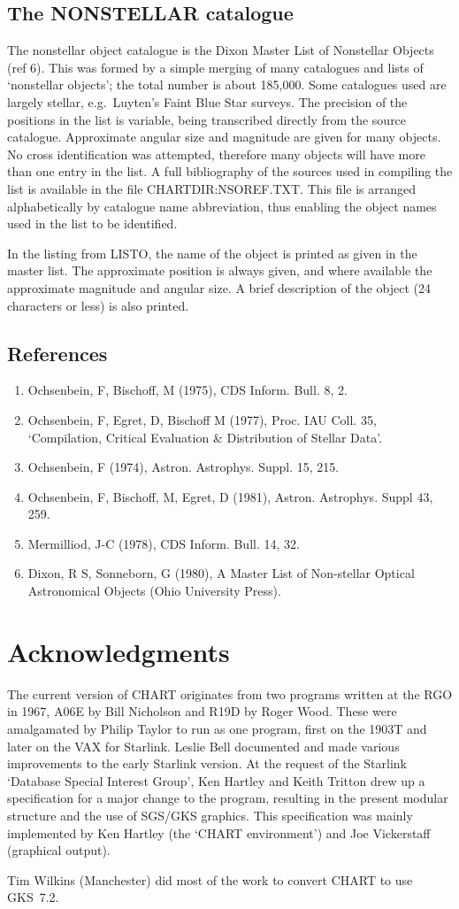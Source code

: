 \documentclass{article}
\begin{document}
\subsection{The NONSTELLAR catalogue}
The nonstellar object catalogue is the Dixon Master List of Nonstellar Objects
(ref 6).
This was formed by a simple merging of many catalogues and lists of
`nonstellar objects'; the total number is about 185,000.
Some catalogues used are largely stellar, e.g.\ Luyten's Faint Blue Star
surveys. The precision of the positions in the list is variable, being
transcribed directly from the source catalogue.
Approximate angular size and magnitude are given for many objects.
No cross identification was attempted, therefore many objects will have more
than one entry in the list.
A full bibliography of the sources used in compiling the list is available in
the file CHARTDIR:NSOREF.TXT.
This file is arranged alphabetically by catalogue name abbreviation, thus
enabling the object names used in the list to be identified.

In the listing from LISTO, the name of the object is printed as given in the
master list.
The approximate position is always given, and where available the approximate
magnitude and angular size.
A brief description of the object (24 characters or less) is also printed.
\subsection{References}
\begin{enumerate}
\item Ochsenbein, F, Bischoff, M (1975), CDS Inform. Bull. 8, 2.
\item Ochsenbein, F, Egret, D, Bischoff M (1977), Proc. IAU Coll. 35,
    `Compilation, Critical Evaluation \& Distribution of Stellar Data'.
\item Ochsenbein, F (1974), Astron. Astrophys. Suppl. 15, 215.
\item Ochsenbein, F, Bischoff, M, Egret, D (1981), Astron. Astrophys.
    Suppl 43, 259.
\item Mermilliod, J-C (1978), CDS Inform. Bull. 14, 32.
\item Dixon, R S, Sonneborn, G (1980),  A Master List of Non-stellar
    Optical Astronomical Objects (Ohio University Press).
\end{enumerate}
\section{Acknowledgments}
The current version of CHART originates from two programs written at the RGO in
1967, A06E by Bill Nicholson and R19D by Roger Wood.
These were amalgamated by Philip Taylor to run as one program, first on the
1903T and later on the VAX for Starlink.
Leslie Bell documented and made various improvements to the early Starlink
version.
At the request of the Starlink `Database Special Interest Group', Ken Hartley
and Keith Tritton drew up a specification for a major change to the program,
resulting in the present modular structure and the use of SGS/GKS graphics.
This specification was mainly implemented by Ken Hartley (the `CHART
environment') and Joe Vickerstaff (graphical output).

Tim Wilkins (Manchester) did most of the work to convert CHART to use GKS~7.2.
\end{document}
